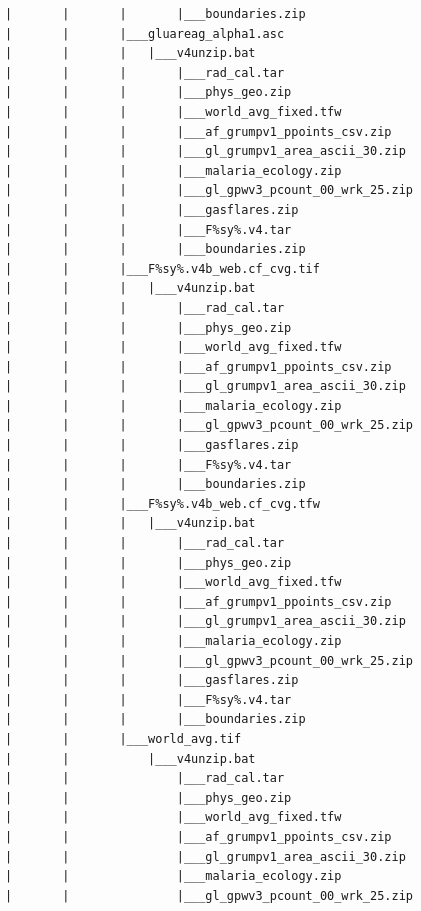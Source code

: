 \documentclass[
]{book}
\begin{document}
\begin{verbatim}
            |       |       |       |___boundaries.zip
            |       |       |___gluareag_alpha1.asc
            |       |       |   |___v4unzip.bat
            |       |       |       |___rad_cal.tar
            |       |       |       |___phys_geo.zip
            |       |       |       |___world_avg_fixed.tfw
            |       |       |       |___af_grumpv1_ppoints_csv.zip
            |       |       |       |___gl_grumpv1_area_ascii_30.zip
            |       |       |       |___malaria_ecology.zip
            |       |       |       |___gl_gpwv3_pcount_00_wrk_25.zip
            |       |       |       |___gasflares.zip
            |       |       |       |___F%sy%.v4.tar
            |       |       |       |___boundaries.zip
            |       |       |___F%sy%.v4b_web.cf_cvg.tif
            |       |       |   |___v4unzip.bat
            |       |       |       |___rad_cal.tar
            |       |       |       |___phys_geo.zip
            |       |       |       |___world_avg_fixed.tfw
            |       |       |       |___af_grumpv1_ppoints_csv.zip
            |       |       |       |___gl_grumpv1_area_ascii_30.zip
            |       |       |       |___malaria_ecology.zip
            |       |       |       |___gl_gpwv3_pcount_00_wrk_25.zip
            |       |       |       |___gasflares.zip
            |       |       |       |___F%sy%.v4.tar
            |       |       |       |___boundaries.zip
            |       |       |___F%sy%.v4b_web.cf_cvg.tfw
            |       |       |   |___v4unzip.bat
            |       |       |       |___rad_cal.tar
            |       |       |       |___phys_geo.zip
            |       |       |       |___world_avg_fixed.tfw
            |       |       |       |___af_grumpv1_ppoints_csv.zip
            |       |       |       |___gl_grumpv1_area_ascii_30.zip
            |       |       |       |___malaria_ecology.zip
            |       |       |       |___gl_gpwv3_pcount_00_wrk_25.zip
            |       |       |       |___gasflares.zip
            |       |       |       |___F%sy%.v4.tar
            |       |       |       |___boundaries.zip
            |       |       |___world_avg.tif
            |       |           |___v4unzip.bat
            |       |               |___rad_cal.tar
            |       |               |___phys_geo.zip
            |       |               |___world_avg_fixed.tfw
            |       |               |___af_grumpv1_ppoints_csv.zip
            |       |               |___gl_grumpv1_area_ascii_30.zip
            |       |               |___malaria_ecology.zip
            |       |               |___gl_gpwv3_pcount_00_wrk_25.zip

\end{verbatim}
\end{document}
